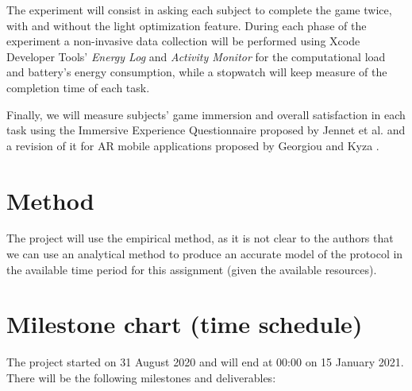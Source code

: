 \documentclass[12pt,twoside,english]{article}
\begin{document}
The experiment will consist in asking each subject to complete the game twice, with and without the light optimization feature. During each phase of the experiment a non-invasive data collection will be performed using Xcode Developer Tools' \emph{Energy Log} and \emph{Activity Monitor} for the computational load and battery's energy consumption, while a stopwatch will keep measure of the completion time of each task.

Finally, we will measure subjects' game immersion and overall satisfaction in each task using the Immersive Experience Questionnaire proposed by Jennet et al.\cite{jennett_measuring_2008} and a revision of it for AR mobile applications proposed by Georgiou and Kyza \cite{georgiou_development_2017}.

\section{Method}
\label{sect:method}

The project will use the empirical method\cite{peter_bock_getting_2001}, as it is not clear to the authors that we can use an analytical method to produce an accurate model of the protocol in the available time period for this assignment (given the available resources).

\section{Milestone chart (time schedule)}
\label{sect:milestones}

The project started on 31 August 2020 and will end at 00:00 on 15 January 2021. There will be the following milestones and deliverables:
\end{document}
